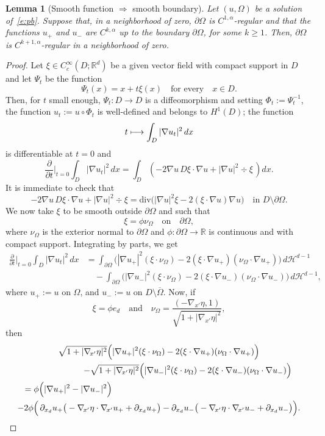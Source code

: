 \documentclass[11pt]{article}
\numberwithin{equation}{section}
\def\mto{\mathchoice{\longmapsto}{\mapsto}{\mapsto}{\mapsto}}
\theoremstyle{plain}
\newtheorem{lemma}[teo]{Lemma}
\theoremstyle{definition}
\let\ds\displaystyle
\def\R{\mathbb{R}}
\def\HH{\mathcal{H}}
\begin{document}
\begin{lemma}[Smooth function $\Rightarrow$ smooth boundary] \label{l:reg2}
Let $(u,\Omega)$ be a solution of~\eqref{e:pb}. Suppose that, in a neighborhood of zero, $\partial\Omega$ is $C^{1,\alpha}$-regular and that the functions $u_+$ and $u_-$ are $C^{k,\alpha}$ up to the boundary $\partial\Omega$, for some $k\ge 1$. Then, $\partial\Omega$ is $C^{k+1,\alpha}$-regular in a neighborhood of zero.
\end{lemma}
\begin{proof}
Let $\xi\in C^\infty_c(D ;\R^d)$ be a given vector field with compact support in $D$ and let $\Psi_t$ be the function
\[\Psi_t(x)=x+t\xi (x)\quad\text{for every}\quad x\in D.\]
Then, for $t$ small enough, $\Psi_t: D\to D$ is a diffeomorphism and setting $\Phi_t:=\Psi_t^{-1}$, the function $u_t:=u\circ \Phi_t$ is well-defined and belongs to $H^1(D)$; the function
\[
\ds t\mto\int_{D}|\nabla u_t|^2\,dx
\]
is differentiable at $t=0$ and
\[\frac{\partial}{\partial t}\Big\vert_{t=0}\int_{D}|\nabla u_t|^2\,dx= \int_{D}\left(-2\nabla u\, D\xi\cdot \nabla u+ |\nabla u|^2\div\xi\,\right)dx.\]
It is immediate to check that
\[-2\nabla u\, D\xi\cdot \nabla u+ |\nabla u|^2\div\xi = \text{div}\big(|\nabla u|^2\xi-2(\xi\cdot\nabla u)\nabla u\big)\quad\text{in } D\setminus\partial\Omega.\]
We now take $\xi$ to be smooth outside $\partial \Omega$ and such that
\[\xi=\phi \nu_\Omega\quad\text{on}\quad \partial\Omega,\]
where $\nu_\Omega$ is the exterior normal to
$\partial\Omega$ and $\phi:\partial\Omega\to\R$ is continuous and with compact support. Integrating by parts, we get
\begin{align*}
\frac{\partial}{\partial t}\Big\vert_{t=0}\int_{D}|\nabla u_t|^2\,dx&=\int_{\partial\Omega}\Big(|\nabla u_+|^2(\xi\cdot\nu_\Omega)-2(\xi\cdot\nabla u_+)(\nu_\Omega\cdot\nabla u_+)\Big)\,d\HH^{d-1}\\
&\quad-\int_{\partial\Omega}\Big(|\nabla u_-|^2(\xi\cdot\nu_\Omega)-2(\xi\cdot\nabla u_-)(\nu_\Omega\cdot\nabla u_-)\Big)\,d\HH^{d-1},
\end{align*}
where $u_+:=u$ on $\Omega$, and $u_-:=u$ on $D\setminus\overline \Omega$. Now, if
\[\xi=\phi e_d\quad\text{and}\quad\nu_\Omega=\frac{(-\nabla_{\!x'}\eta,1)}{\sqrt{1+|\nabla_{\!x'}\eta|^2}},\]
then
\begin{multline*}
\sqrt{1+|\nabla_{\!x'}\eta|^2}\Big(|\nabla u_+|^2(\xi\cdot\nu_\Omega)-2(\xi\cdot\nabla u_+)(\nu_\Omega\cdot\nabla u_+)\Big)\\
\shoveright{-\sqrt{1+|\nabla_{\!x'}\eta|^2}\Big(|\nabla u_-|^2(\xi\cdot\nu_\Omega)-2(\xi\cdot\nabla u_-)(\nu_\Omega\cdot\nabla u_-)\Big)}\\
\shoveleft{=\phi\Big(|\nabla u_+|^2-|\nabla u_-|^2\Big)}\\
-2\phi\Big(\,\partial_{x_d}u_+\big(-\nabla_{\!x'}\eta\cdot\nabla_{\!x'}u_++\partial_{x_d}u_+\big)-\partial_{x_d}u_-\big(-\nabla_{\!x'}\eta\cdot\nabla_{\!x'}u_-+\partial_{x_d}u_-\big)\Big).
\end{multline*}


\end{proof}
\end{document}
